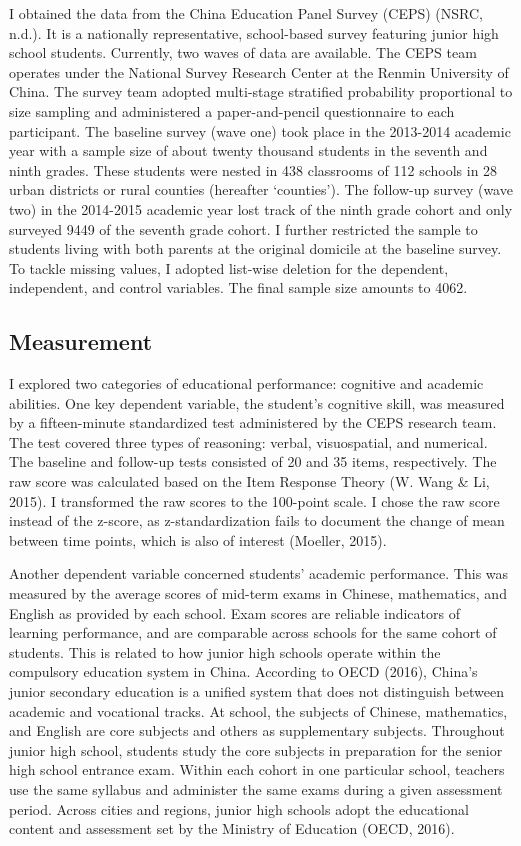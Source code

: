 \documentclass[
  man,floatsintext]{apa7}
\begin{document}
I obtained the data from the China Education Panel Survey (CEPS) (NSRC, n.d.). It is a nationally representative, school-based survey featuring junior high school students. Currently, two waves of data are available. The CEPS team operates under the National Survey Research Center at the Renmin University of China. The survey team adopted multi-stage stratified probability proportional to size sampling and administered a paper-and-pencil questionnaire to each participant. The baseline survey (wave one) took place in the 2013-2014 academic year with a sample size of about twenty thousand students in the seventh and ninth grades. These students were nested in 438 classrooms of 112 schools in 28 urban districts or rural counties (hereafter `counties'). The follow-up survey (wave two) in the 2014-2015 academic year lost track of the ninth grade cohort and only surveyed 9449 of the seventh grade cohort. I further restricted the sample to students living with both parents at the original domicile at the baseline survey. To tackle missing values, I adopted list-wise deletion for the dependent, independent, and control variables. The final sample size amounts to 4062.

\hypertarget{measurement}{%
\subsection{Measurement}\label{measurement}}

I explored two categories of educational performance: cognitive and academic abilities. One key dependent variable, the student's cognitive skill, was measured by a fifteen-minute standardized test administered by the CEPS research team. The test covered three types of reasoning: verbal, visuospatial, and numerical. The baseline and follow-up tests consisted of 20 and 35 items, respectively. The raw score was calculated based on the Item Response Theory (W. Wang \& Li, 2015). I transformed the raw scores to the 100-point scale. I chose the raw score instead of the z-score, as z-standardization fails to document the change of mean between time points, which is also of interest (Moeller, 2015).

Another dependent variable concerned students' academic performance. This was measured by the average scores of mid-term exams in Chinese, mathematics, and English as provided by each school. Exam scores are reliable indicators of learning performance, and are comparable across schools for the same cohort of students. This is related to how junior high schools operate within the compulsory education system in China. According to OECD (2016), China's junior secondary education is a unified system that does not distinguish between academic and vocational tracks. At school, the subjects of Chinese, mathematics, and English are core subjects and others as supplementary subjects. Throughout junior high school, students study the core subjects in preparation for the senior high school entrance exam. Within each cohort in one particular school, teachers use the same syllabus and administer the same exams during a given assessment period. Across cities and regions, junior high schools adopt the educational content and assessment set by the Ministry of Education (OECD, 2016).
\end{document}
